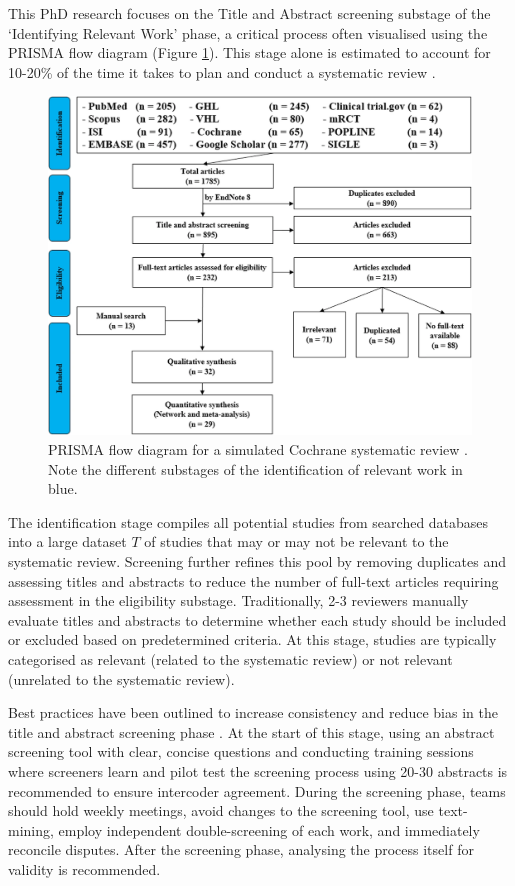 \documentclass{article}
\begin{document}
This PhD research focuses on the Title and Abstract screening substage of the `Identifying Relevant Work' phase, a critical process often visualised using the PRISMA flow diagram (Figure \ref{fig:prisma_flow}). This stage alone is estimated  to account for 10-20\% of the time it takes to plan and conduct a systematic review \cite{haddaway_predicting_2019}.

\begin{figure}
    \centering
    \includegraphics[width=0.5\linewidth]{Confirmation Review//images/prisma_flow.png}
    \caption{PRISMA flow diagram for a simulated Cochrane systematic review \cite{tawfik_protocol_2020}. Note the different substages of the identification of relevant work in blue.}
    \label{fig:prisma_flow}
\end{figure}

The identification stage compiles all potential studies from searched databases into a large dataset $T$ of studies that may or may not be relevant to the systematic review. Screening further refines this pool by removing duplicates and assessing titles and abstracts to reduce the number of full-text articles requiring assessment in the eligibility substage. Traditionally, 2-3 reviewers manually evaluate titles and abstracts to determine whether each study should be included or excluded based on predetermined criteria. At this stage, studies are typically categorised as relevant (related to the systematic review) or not relevant (unrelated to the systematic review).


Best practices have been outlined to increase consistency and reduce bias in the title and abstract screening phase \cite{polanin_best_2019}. At the start of this stage, using an abstract screening tool with clear, concise questions and conducting training sessions where screeners learn and pilot test the screening process using 20-30 abstracts is recommended to ensure intercoder agreement. During the screening phase, teams should hold weekly meetings, avoid changes to the screening tool, use text-mining, employ independent double-screening of each work, and immediately reconcile disputes. After the screening phase, analysing the process itself for validity is recommended.
\end{document}
